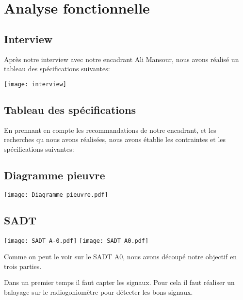 \chapter{Analyse fonctionnelle}

\section{Interview}

Après notre interview avec notre encadrant Ali Mansour, nous avons réalisé un tableau des spécifications suivantes:

\texttt{[image: interview]}


\section{Tableau des spécifications}
En prennant en compte les recommandations de notre encadrant, et les recherches qu nous avons réalisées, nous avons établie les contraintes et les spécifications suivantes:





\section{Diagramme pieuvre}

\hspace{-2cm}
\texttt{[image: Diagramme\_pieuvre.pdf]}



\section{SADT}

\texttt{[image: SADT\_A-0.pdf]}
\texttt{[image: SADT\_A0.pdf]}

\parindent=15pt

Comme on peut le voir sur le SADT A0, nous avons découpé notre objectif en trois parties.

Dans un premier temps il faut capter les signaux. Pour cela il faut réaliser un balayage sur le radiogoniomètre pour détecter les bons signaux.

